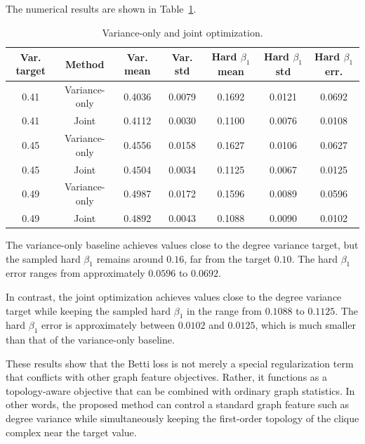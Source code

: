 \documentclass[pdflatex,sn-mathphys-ay]{sn-jnl}%
\theoremstyle{thmstyleone}%
\theoremstyle{thmstyletwo}%
\theoremstyle{thmstylethree}%
\begin{document}
The numerical results are shown in Table~\ref{tab:joint_objective}.

\begin{table}[t]
    \centering
    \caption{Variance-only and joint optimization.}
    \label{tab:joint_objective}
    \small
    \begin{tabular}{c|c|c|c|c|c|c}
        \hline
        Var. target & Method & Var. mean & Var. std
        & Hard $\beta_1$ mean & Hard $\beta_1$ std & Hard $\beta_1$ err. \\
        \hline
        0.41 & Variance-only & 0.4036 & 0.0079 & 0.1692 & 0.0121 & 0.0692 \\
        0.41 & Joint         & 0.4112 & 0.0030 & 0.1100 & 0.0076 & 0.0108 \\
        0.45 & Variance-only & 0.4556 & 0.0158 & 0.1627 & 0.0106 & 0.0627 \\
        0.45 & Joint         & 0.4504 & 0.0034 & 0.1125 & 0.0067 & 0.0125 \\
        0.49 & Variance-only & 0.4987 & 0.0172 & 0.1596 & 0.0089 & 0.0596 \\
        0.49 & Joint         & 0.4892 & 0.0043 & 0.1088 & 0.0090 & 0.0102 \\
        \hline
    \end{tabular}
\end{table}

The variance-only baseline achieves values close to the degree variance target, but the sampled hard $\beta_1$ remains around $0.16$, far from the target $0.10$. The hard $\beta_1$ error ranges from approximately $0.0596$ to $0.0692$.

In contrast, the joint optimization achieves values close to the degree variance target while keeping the sampled hard $\beta_1$ in the range from $0.1088$ to $0.1125$. The hard $\beta_1$ error is approximately between $0.0102$ and $0.0125$, which is much smaller than that of the variance-only baseline.

These results show that the Betti loss is not merely a special regularization term that conflicts with other graph feature objectives. Rather, it functions as a topology-aware objective that can be combined with ordinary graph statistics. In other words, the proposed method can control a standard graph feature such as degree variance while simultaneously keeping the first-order topology of the clique complex near the target value.
\end{document}
